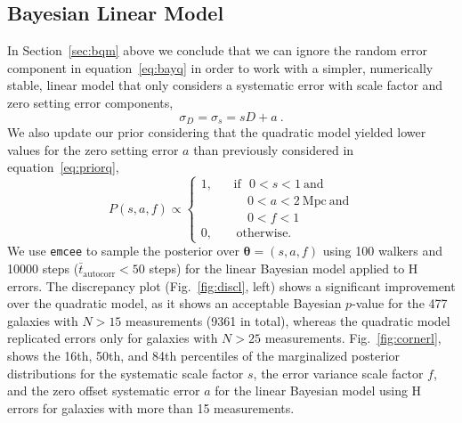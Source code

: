 \documentclass[a4paper,fleqn,usenatbib]{mnras}
\begin{document}
\subsection{Bayesian Linear Model}
\label{sec:blm}
In Section~\ref{sec:bqm} above we conclude that we can ignore the random error component in equation~\ref{eq:bayq} in order to work with a simpler, numerically stable, linear model that only considers a systematic error with scale factor and zero setting error components,
\begin{equation}
\sigma_D=\sigma_s=sD+a\ .
	\label{eq:bayl}
\end{equation}
We also update our prior considering that the quadratic model yielded lower values for the zero setting error $a$ than previously considered in equation~\ref{eq:priorq},
\begin{equation}
P(s,a,f)\propto\left\{
\begin{aligned}
1,\ \ \ \ &\mathrm{if}\ \ \ 0<s<1\ \mathrm{and}\\
& \ \ \ \ \  0<a<2\ \mathrm{Mpc}\ \mathrm{and}\\
& \ \ \ \ \  0<f<1\\
0,\ \ \ \ &\ \mathrm{otherwise.}
\end{aligned}
\right.
\end{equation}
We use \texttt{emcee} to sample the posterior over $\pmb{\theta}=(s,a,f)$ using 100 walkers and 10000 steps ($\bar{t}_\mathrm{autocorr} < 50$ steps) for the linear Bayesian model applied to H errors. The discrepancy plot (Fig.~\ref{fig:discl}, left) shows a significant improvement over the quadratic model, as it shows an acceptable Bayesian $p$-value for the 477 galaxies with $N>15$ measurements (9361 in total), whereas the quadratic model replicated errors only for galaxies with $N>25$ measurements. Fig.~\ref{fig:cornerl}, shows the 16th, 50th, and 84th percentiles of the marginalized posterior distributions for the systematic scale factor $s$, the error variance scale factor $f$, and the zero offset systematic error $a$ for the linear Bayesian model using H errors for galaxies with more than 15 measurements.
\end{document}
